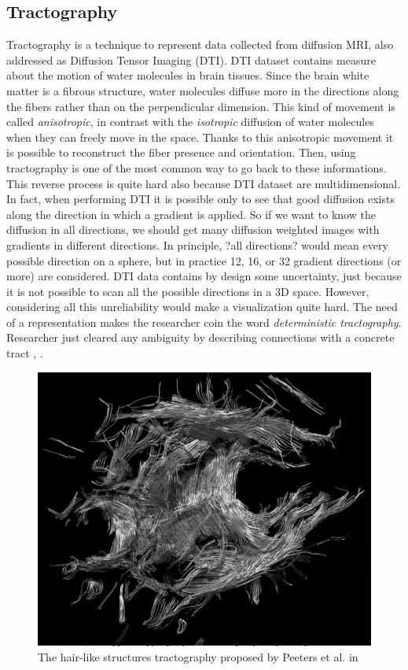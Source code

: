 \documentclass{article}
\begin{document}
\begin{multicols}{2}
\subsection{Tractography}
Tractography is a technique to represent data collected from diffusion MRI, also addressed as Diffusion Tensor Imaging (DTI). DTI dataset contains measure about the motion of water molecules in brain tissues. Since the brain white matter is a fibrous structure, water molecules diffuse more in the directions along the fibers rather than on the perpendicular dimension. This kind of movement is called \textit{anisotropic}, in contrast with the \textit{isotropic} diffusion of water molecules when they can freely move in the space. Thanks to this anisotropic movement it is possible to reconstruct the fiber presence and orientation. Then, using tractography is one of the most common way to go back to these informations. This reverse process is quite hard also because DTI dataset are multidimensional. In fact, when performing DTI it is possible only to see that good diffusion exists along the direction in which a gradient is applied. So if we want to know the diffusion in all directions, we should get many diffusion weighted images with gradients in different directions. In principle, ?all directions? would mean every possible direction on a sphere, but in practice 12, 16, or 32 gradient directions (or more) are considered. DTI data contains by design some uncertainty, just because it is not possible to scan all the possible directions in a 3D space. However, considering all this unreliability would make a visualization quite hard. The need of a representation makes the researcher coin the word \textit{deterministic tractography}. Researcher just cleared any ambiguity by describing connections with a concrete tract \cite{conturo1999tracking}, \cite{mori1999three}. 

\begin{figure}[H]
\centering
\includegraphics[width = 0.8\columnwidth]{hairLike}
\caption{The hair-like structures tractography proposed by Peeters et al. in \cite{peeters2006visualization}}
\label{fig:weightedGraph}
\end{figure}


\end{multicols}
\end{document}
